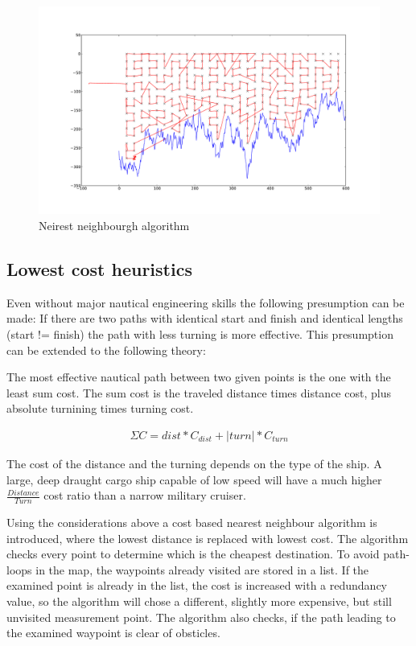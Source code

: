 \begin{figure}[H]
	\centering
	\includegraphics[width=\textwidth]{img/nn}
	\caption{Neirest neighbourgh algorithm}
	\label{fig:nn}
\end{figure}

\subsection{Lowest cost heuristics}

Even without major nautical engineering skills the following presumption can be made: If there are two paths with identical start and finish and identical lengths (start != finish) the  path with less turning is more effective.
This presumption can be extended to the following theory:

The most effective nautical path between two given points is the one with the least sum cost. The sum cost is the traveled distance times distance cost, plus absolute turnining times turning cost.

\begin{align}
	\Sigma C  = dist*C_{dist} + |turn| * C_{turn}
\end{align}

The cost of the distance and the turning depends on the type of the ship. A large, deep draught cargo ship capable of low speed will have a much higher $\frac{Distance}{Turn}$ cost ratio than a narrow military cruiser.


Using the considerations above a cost based nearest neighbour algorithm is introduced, where the lowest distance is replaced with lowest cost. The algorithm checks every point to determine which is the cheapest destination. To avoid path-loops in the map, the waypoints already visited are stored in a list. If the examined point is already in the list, the cost is increased with a redundancy value, so the algorithm will chose a different, slightly more expensive, but still unvisited measurement point. The algorithm also checks, if the path leading to the examined waypoint is clear of obsticles.

